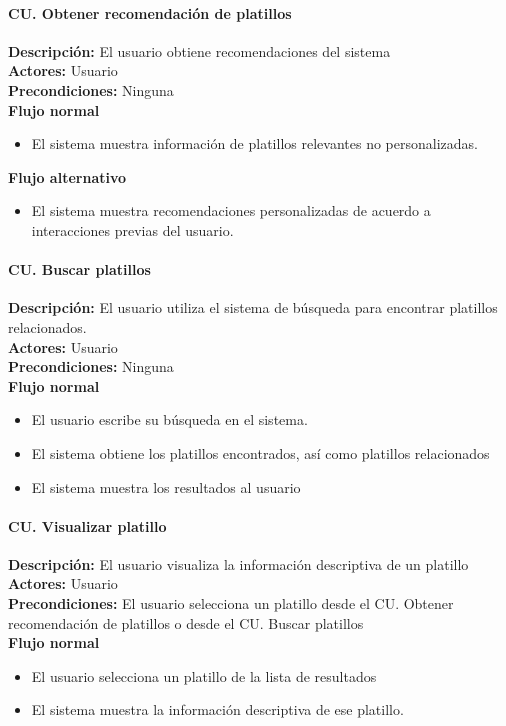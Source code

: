 \paragraph{CU. Obtener recomendación de platillos\\} 
	\textbf{Descripción:} El usuario obtiene recomendaciones del sistema\\
	\textbf{Actores:} Usuario \\
	\textbf{Precondiciones:} Ninguna \\
	\textbf{Flujo normal}\\
	\begin{itemize}
		\item El sistema muestra información de platillos relevantes no personalizadas.
	\end{itemize}
	\textbf{Flujo alternativo}\\
	\begin{itemize}
		\item El sistema muestra recomendaciones personalizadas de acuerdo a interacciones previas del usuario.
	\end{itemize}
	
	\paragraph{CU. Buscar platillos\\}
		\textbf{Descripción:} El usuario utiliza el sistema de búsqueda para encontrar platillos relacionados.\\
		\textbf{Actores:} Usuario\\
		\textbf{Precondiciones:} Ninguna\\
		\textbf{Flujo normal}\\
		\begin{itemize}
			\item El usuario escribe su búsqueda en el sistema. 
			\item El sistema obtiene los platillos encontrados, así como platillos relacionados
			\item El sistema muestra los resultados al usuario
		\end{itemize}
		
		\paragraph{CU. Visualizar platillo\\}
			\textbf{Descripción:} El usuario visualiza la información descriptiva de un platillo\\
			\textbf{Actores:} Usuario\\
			\textbf{Precondiciones:} El usuario selecciona un platillo desde el CU. Obtener recomendación de platillos o desde el CU. Buscar platillos\\
			\textbf{Flujo normal}\\
			\begin{itemize}
				\item El usuario selecciona un platillo de la lista de resultados
				\item El sistema muestra la información descriptiva de ese platillo.
			\end{itemize}
			\newpage
